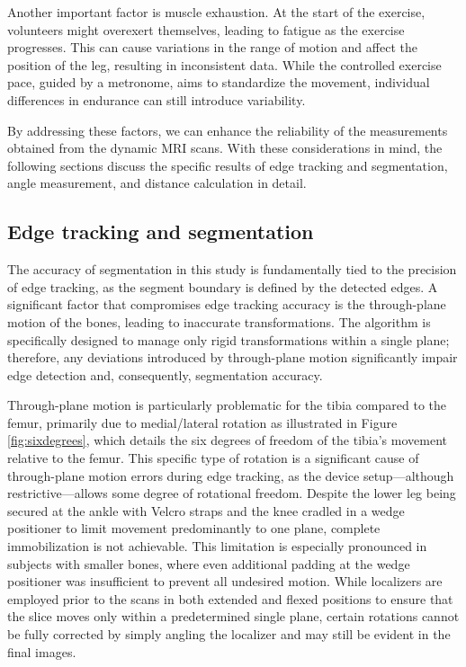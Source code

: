 \documentclass{micro-econ-thesis}
\begin{document}
Another important factor is muscle exhaustion. At the start of the exercise, volunteers might overexert themselves, leading to fatigue as the exercise progresses. This can cause variations in the range of motion and affect the position of the leg, resulting in inconsistent data. While the controlled exercise pace, guided by a metronome, aims to standardize the movement, individual differences in endurance can still introduce variability.

By addressing these factors, we can enhance the reliability of the measurements obtained from the dynamic MRI scans. With these considerations in mind, the following sections discuss the specific results of edge tracking and segmentation, angle measurement, and distance calculation in detail.

\subsection{Edge tracking and segmentation}
The accuracy of segmentation in this study is fundamentally tied to the precision of edge tracking, as the segment boundary is defined by the detected edges. A significant factor that compromises edge tracking accuracy is the through-plane motion of the bones, leading to inaccurate transformations. The algorithm is specifically designed to manage only rigid transformations within a single plane; therefore, any deviations introduced by through-plane motion significantly impair edge detection and, consequently, segmentation accuracy.

Through-plane motion is particularly problematic for the tibia compared to the femur, primarily due to medial/lateral rotation as illustrated in Figure \ref{fig:sixdegrees}, which details the six degrees of freedom of the tibia's movement relative to the femur. This specific type of rotation is a significant cause of through-plane motion errors during edge tracking, as the device setup—although restrictive—allows some degree of rotational freedom. Despite the lower leg being secured at the ankle with Velcro straps and the knee cradled in a wedge positioner to limit movement predominantly to one plane, complete immobilization is not achievable. This limitation is especially pronounced in subjects with smaller bones, where even additional padding at the wedge positioner was insufficient to prevent all undesired motion. While localizers are employed prior to the scans in both extended and flexed positions to ensure that the slice moves only within a predetermined single plane, certain rotations cannot be fully corrected by simply angling the localizer and may still be evident in the final images.
\end{document}
